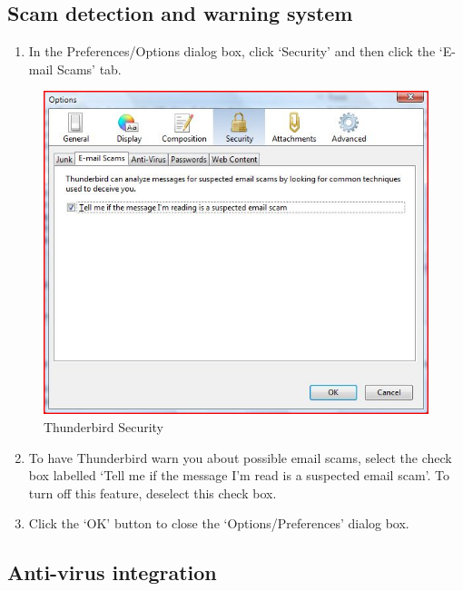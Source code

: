 \subsection{Scam detection and warning system}

\begin{enumerate}[1.]
\item
  In the Preferences/Options dialog box, click `Security' and then click
  the `E-mail Scams' tab.
\end{enumerate}
\begin{figure}[htbp]
\centering
\includegraphics{thunderbird_sec_2.jpg}
\caption{Thunderbird Security}
\end{figure}

\begin{enumerate}[1.]
\setcounter{enumi}{1}
\item
  To have Thunderbird warn you about possible email scams, select the
  check box labelled `Tell me if the message I'm read is a suspected
  email scam'. To turn off this feature, deselect this check box.
\item
  Click the `OK' button to close the `Options/Preferences' dialog box.
\end{enumerate}
\subsection{Anti-virus integration}

